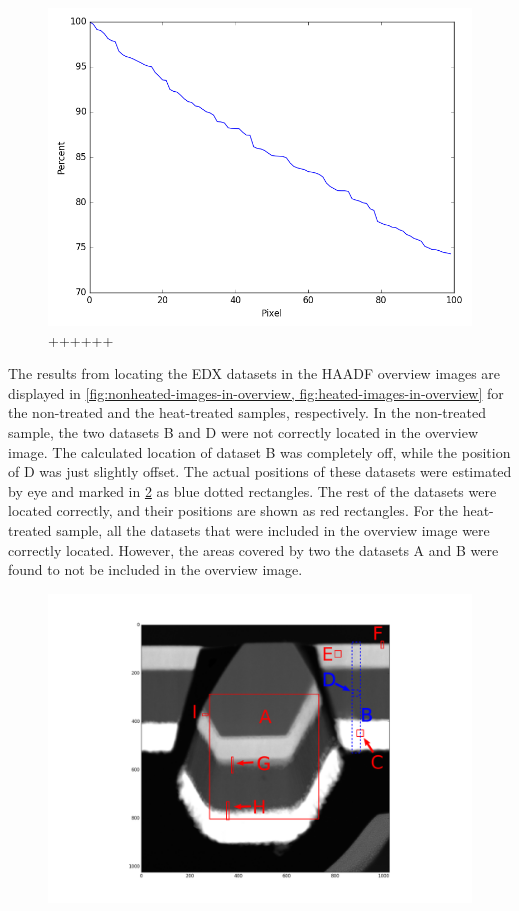 \begin{figure}
	\includegraphics[width=0.7\linewidth]{fig/edx-sped-rectangle-match-graph.png}
	\caption{++++++}
	\label{fig:edx-sped-rectangle-match-graph}
\end{figure}

The results from locating the EDX datasets in the HAADF overview images are displayed in \cref{fig:nonheated-images-in-overview, fig:heated-images-in-overview} for the non-treated and the heat-treated samples, respectively. In the non-treated sample, the two datasets B and D were not correctly located in the overview image. The calculated location of dataset B was completely off, while the position of D was just slightly offset. The actual positions of these datasets were estimated by eye and marked in \cref{fig:nonheated-images-in-overview} as blue dotted rectangles. The rest of the datasets were located correctly, and their positions are shown as red rectangles. For the heat-treated sample, all the datasets that were included in the overview image were correctly located. However, the areas covered by two the datasets A and B were found to not be included in the overview image.

\begin{figure}
\centering
\includegraphics[width=0.7\linewidth]{"fig/nonheated-images-in-overview (correct)2"}
\caption{}
\label{fig:nonheated-images-in-overview}
\end{figure}

